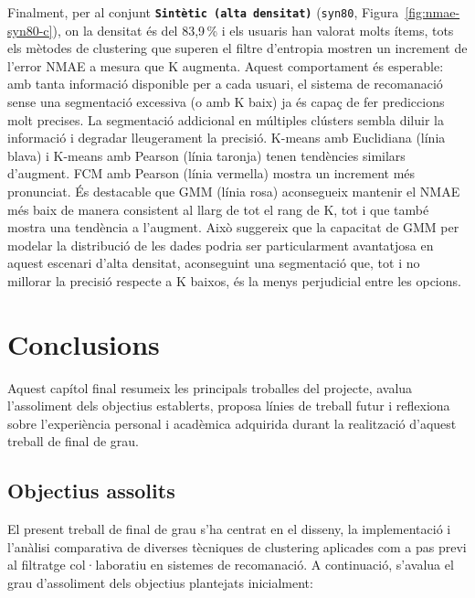 \documentclass[a4paper,12pt]{report}
\begin{document}
Finalment, per al conjunt \textbf{\texttt{Sintètic (alta densitat)}} (\texttt{syn80}, Figura~\ref{fig:nmae-syn80-c}), on la densitat és del 83,9\,\% i els usuaris han valorat molts ítems, tots els mètodes de clustering que superen el filtre d'entropia mostren un increment de l'error NMAE a mesura que K augmenta. Aquest comportament és esperable: amb tanta informació disponible per a cada usuari, el sistema de recomanació sense una segmentació excessiva (o amb K baix) ja és capaç de fer prediccions molt precises. La segmentació addicional en múltiples clústers sembla diluir la informació i degradar lleugerament la precisió. K-means amb Euclidiana (línia blava) i K-means amb Pearson (línia taronja) tenen tendències similars d'augment. FCM amb Pearson (línia vermella) mostra un increment més pronunciat. És destacable que GMM (línia rosa) aconsegueix mantenir el NMAE més baix de manera consistent al llarg de tot el rang de K, tot i que també mostra una tendència a l'augment. Això suggereix que la capacitat de GMM per modelar la distribució de les dades podria ser particularment avantatjosa en aquest escenari d'alta densitat, aconseguint una segmentació que, tot i no millorar la precisió respecte a K baixos, és la menys perjudicial entre les opcions.

\chapter{Conclusions}
\label{chap:conclusions}

Aquest capítol final resumeix les principals troballes del projecte, avalua l'assoliment dels objectius establerts, proposa línies de treball futur i reflexiona sobre l'experiència personal i acadèmica adquirida durant la realització d'aquest treball de final de grau.

\section{Objectius assolits}
\label{sec:objectius_assolits}

El present treball de final de grau s'ha centrat en el disseny, la implementació i l'anàlisi comparativa de diverses tècniques de clustering aplicades com a pas previ al filtratge col·laboratiu en sistemes de recomanació. A continuació, s'avalua el grau d'assoliment dels objectius plantejats inicialment:
\end{document}

